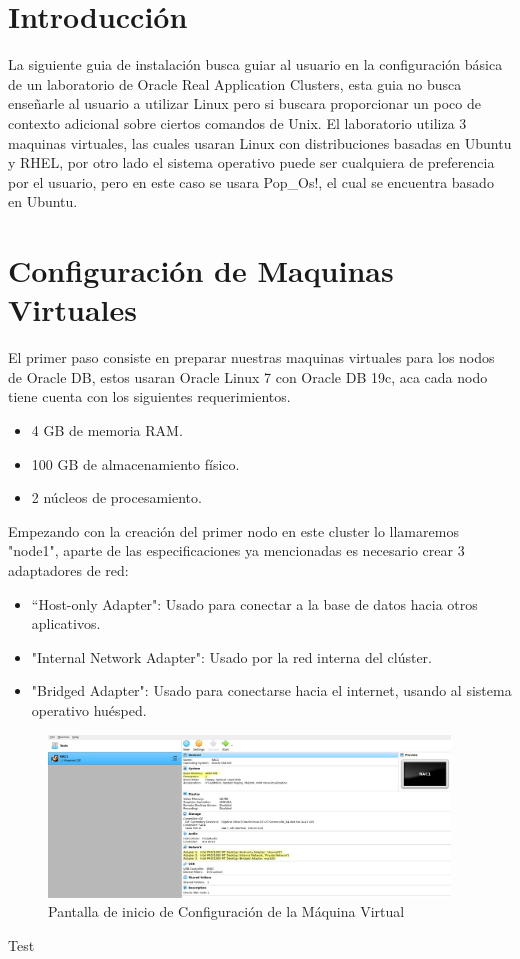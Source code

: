 \documentclass{article}
\begin{document}
\section{Introducción}

La siguiente guia de instalación busca guiar al usuario en la configuración básica de un laboratorio de Oracle Real Application Clusters, esta guia no busca enseñarle al usuario a utilizar Linux pero si buscara proporcionar un poco de contexto adicional sobre ciertos comandos de Unix. El laboratorio utiliza 3 maquinas virtuales, las cuales usaran Linux con distribuciones basadas en Ubuntu y RHEL, por otro lado el sistema operativo puede ser cualquiera de preferencia por el usuario, pero en este caso se usara Pop\_Os!, el cual se encuentra basado en Ubuntu.

\section{Configuración de Maquinas Virtuales}

El primer paso consiste en preparar nuestras maquinas virtuales para los nodos de Oracle DB, estos usaran Oracle Linux 7 con Oracle DB 19c, aca cada nodo tiene cuenta con los siguientes requerimientos.

\begin{itemize}
    \item 4 GB de memoria RAM.
    \item 100 GB de almacenamiento físico.
    \item 2 núcleos de procesamiento.
\end{itemize}

Empezando con la creación del primer nodo en este cluster lo llamaremos "node1", aparte de las especificaciones ya mencionadas es necesario crear 3 adaptadores de red:

\begin{itemize}
    \item “Host-only Adapter": Usado para conectar a la base de datos hacia otros aplicativos. 
    \item "Internal Network Adapter": Usado por la red interna del clúster. 
    \item "Bridged Adapter": Usado para conectarse hacia el internet, usando al sistema operativo huésped. 
\end{itemize}

\begin{figure}[H]
    \begin{center}
        \includegraphics[width=0.95\textwidth]{vm_base.png}
    \end{center}
    \caption{Pantalla de inicio de Configuración de la Máquina Virtual}
\end{figure}

Test
\end{document}
